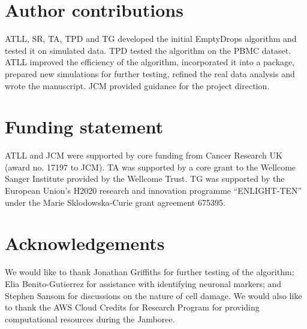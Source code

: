 \documentclass[10pt,letterpaper]{article}
\begin{document}
\section*{Author contributions}
ATLL, SR, TA, TPD and TG developed the initial EmptyDrops algorithm and tested it on simulated data.
TPD tested the algorithm on the PBMC dataset.
ATLL improved the efficiency of the algorithm, incorporated it into a package, prepared new simulations for further testing, refined the real data analysis and wrote the manuscript.
JCM provided guidance for the project direction. 

\section*{Funding statement}
ATLL and JCM were supported by core funding from Cancer Research UK (award no. 17197 to JCM).
TA was supported by a core grant to the Wellcome Sanger Institute provided by the Wellcome Trust.
TG was supported by the European Union's H2020 research and innovation programme ``ENLIGHT-TEN'' under the Marie Sklodowska-Curie grant agreement 675395.

\section*{Acknowledgements}
We would like to thank Jonathan Griffiths for further testing of the algorithm;
Elia Benito-Gutierrez for assistance with identifying neuronal markers;
and Stephen Sansom for discussions on the nature of cell damage.
We would also like to thank the AWS Cloud Credits for Research Program for providing computational resources during the Jamboree.



\end{document}
